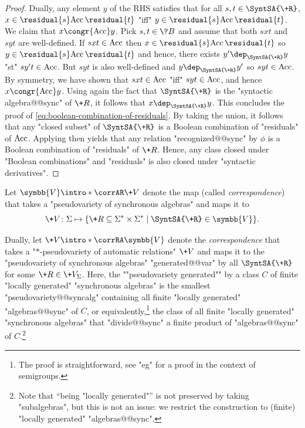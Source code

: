 \begin{proof}
	Dually, any element $y$ of the RHS satisfies that for all $s, t \in \SyntSA{\+R}$,
	$x \in \residual{s} \Acc\,\residual{t}$ "iff" $y \in \residual{s} \Acc\,\residual{t}$.
	We claim that $x \congr{\Acc} y$. Pick $s, t \in \?B$ and assume that
	both $sxt$ and $syt$ are well-defined. If $sxt \in \textrm{Acc}$ then $x \in \residual{s} \Acc\,\residual{t}$ so $y \in \residual{s} \Acc\,\residual{t}$ and hence, there
	exists $y' \dep_{\SyntSA{\+R}} y$ "st" $sy't \in \textrm{Acc}$. But $syt$ is also well-defined
	and $y \dep_{\SyntSA{\+R}} y'$ so $syt \in \textrm{Acc}$. By symmetry, we have shown that
	$sxt \in \textrm{Acc}$ "iff" $syt \in \textrm{Acc}$, and hence $x \congr{\Acc} y$.
	Using again the fact that $\SyntSA{\+R}$ is the "syntactic algebra@@sync" of $\+R$, it 
	follows that $x \dep_{\SyntSA{\+R}} y$. This concludes the proof of
	\eqref{eq:boolean-combination-of-residuals}. By taking the union, it
	follows that any "closed subset" of $\SyntSA{\+R}$ is a Boolean combination
	of "residuals" of $\textrm{Acc}$. Applying 
	then yields that any relation "recognized@@sync" by $\phi$ is a Boolean combination of 
	"residuals" of $\+R$. Hence, any class closed under "Boolean combinations" and
	"residuals" is also closed under "syntactic derivatives".
\end{proof}

Let \AP$\symbb{V} \intro*\corrAR \+V$ denote the map (called \emph{correspondence}) that takes a 
"pseudovariety of synchronous algebras" and maps it to
\[\+V\colon \Sigma \mapsto \{\+R \subseteq \Sigma^*\times \Sigma^* \mid \SyntSA{\+R} \in \symbb{V}\}.\]

Dually, let \AP$\+V \intro*\corrRA \symbb{V}$ denote the \emph{correspondence} that takes
a "$\ast$-pseudo\-variety of automatic relations" $\+V$
and maps it to the "pseudovariety of synchronous algebras" "generated@@var" by
all $\SyntSA{\+R}$ for some $\+R \in \+V_{\Sigma}$.
Here, the ""pseudovariety generated"" by a class $C$
of finite "locally generated" "synchronous algebras"
is the smallest "pseudovariety@@syncalg" containing
all finite "locally generated" "algebras@@sync" of $C$,
or equivalently,\footnote{The proof is straightforward,
see "eg" \cite[Proposition XI.1.1, p.~190]{Pin2022MathematicalFoundations} for a proof in the context of semigroups.} the class of all finite "locally generated" "synchronous algebras" 
that "divide@@sync" a finite product of "algebras@@sync" of $C$.\footnote{Note that ``being "locally generated"'' is not preserved by taking "subalgebras", but this is not an issue: we restrict the construction to (finite) "locally generated" "algebras@@sync".}


